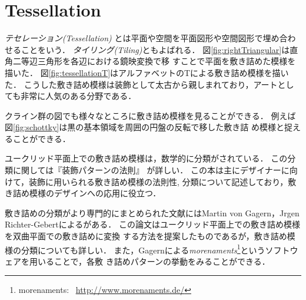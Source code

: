 
\section{Tessellation}

\emph{テセレーション}{\it (Tessellation)}
とは平面や空間を平面図形や空間図形で埋め合わせることをいう．
\emph{タイリング}{\it(Tiling)}ともよばれる．
図\ref{fig:rightTriangular}は直角二等辺三角形を各辺における鏡映変換で移
すことで平面を敷き詰めた模様を描いた．
図\ref{fig:tessellationT}はアルファベットのTによる敷き詰め模様を描いた．
こうした敷き詰め模様は装飾として太古から親しまれており，アートとしても非常に人気のある分野である．

クライン群の図でも様々なところに敷き詰め模様を見ることができる．
例えば図\ref{fig:schottky}は黒の基本領域を周囲の円盤の反転で移した敷き詰
め模様と捉えることができる．

ユークリッド平面上での敷き詰め模様は，数学的に分類がされている．
この分類に関しては『装飾パターンの法則』
\cite{fujitaｰ201507pattern}が詳しい．
この本は主にデザイナーに向けて，装飾に用いられる敷き詰め模様の法則性,
分類について記述しており，敷き詰め模様のデザインへの応用に役立つ．

敷き詰めの分類がより専門的にまとめられた文献にはMartin von Gagern，Jrgen
Richter-Gebertによる\cite{journals/combinatorics/GagernR09}がある．
この論文はユークリッド平面上での敷き詰め模様を双曲平面での敷き詰めに変換
する方法を提案したものであるが，敷き詰め模様の分類についても詳しい．
また，Gagernによる\emph{morenaments}\footnote{morenaments:~
\url{http://www.morenaments.de/}}というソフトウェアを用いることで，各敷
き詰めパターンの挙動をみることができる．

